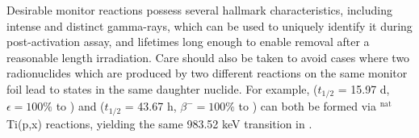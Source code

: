 \documentclass[3p]{elsarticle}
\newcommand{\comment}[1]{\todo[color=blue!20!white,inline]{ASV: #1}}
\begin{document}
Desirable monitor reactions 
possess several hallmark characteristics,  
including intense and distinct gamma-rays, 
which can be used to uniquely identify it during post-activation assay, and lifetimes long enough to enable removal after a reasonable length irradiation.    
Care should also be taken to avoid cases where two radionuclides which are produced by two different reactions on the same monitor foil lead to states in the same daughter nuclide.  
For example,   ($t_{1/2}$ = 15.97 d, $\epsilon=100\%$ to ) and   ($t_{1/2}$ = 43.67 h, $\beta^-=100\%$ to ) can both be formed via $^\text{nat}$Ti(p,x) reactions, yielding the same 983.52 keV transition in  \cite{Burrows2006}.
\end{document}
